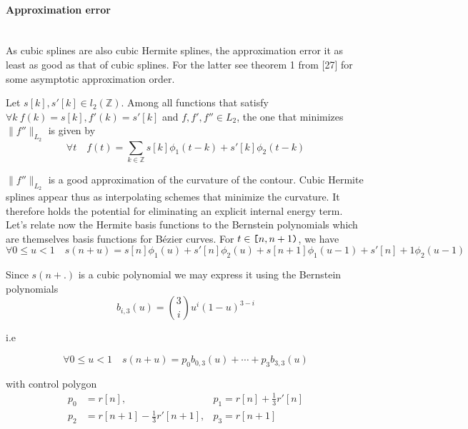 \documentclass[a4paper, 11pt]{article}
\begin{document}
\paragraph{Approximation error} \mbox{} \\

As cubic splines are also cubic Hermite splines, the approximation error it as least as good as that of cubic splines.  
For the latter see theorem 1 from [27] for some asymptotic approximation order. 

\begin{thm}{1}
  Let $s[k], s'[k] \in l_2(\mathbb{Z})$. Among all functions that satisfy $\forall k \ f(k) = s[k], f'(k) = s'[k]$ and 
  $f, f', f'' \in L_2$, the one that minimizes $\|f''\|_{L_2}$ is given by
  \begin{equation}
    \forall t \quad f(t) = \sum_{k \in \mathbb{Z}} s[k] \phi_1(t-k) + s'[k] \phi_2(t-k)
  \end{equation}
\end{thm}

$\|f''\|_{L_2}$ is a good approximation of the curvature of the contour. Cubic Hermite splines appear thus as 
interpolating schemes that minimize the curvature. It therefore holds the potential for eliminating an explicit internal 
energy term. \\ 

Let's relate now the Hermite basis functions to the Bernstein polynomials which are themselves basis functions for 
Bézier curves. For $t \in \verb+[+n, n+1\verb+)+$, we have
\begin{equation}
  \forall 0 \leq u < 1 \quad s(n+u) = s[n] \phi_1(u) + s'[n] \phi_2(u) +  s[n+1] \phi_1(u-1) + s'[n]+1 \phi_2(u-1)
\end{equation}

Since $s(n+.)$ is a cubic polynomial we may express it using the Bernstein polynomials
\begin{equation}
  b_{i, 3}(u) = \binom{3}{i} u^i {(1-u)}^{3-i}
\end{equation}

i.e 

\begin{equation}
  \forall 0 \leq u < 1 \quad s(n+u) = p_0 b_{0,3}(u) + \cdots + p_3 b_{3,3}(u) 
\end{equation}

with control polygon
\begin{align*}
  p_0 &= r[n], &p_1= r[n] + \frac{1}{3}r'[n] \\
  p_2 &= r[n+1] - \frac{1}{3}r'[n+1],  &p_3= r[n+1]\\
\end{align*}
\end{document}
